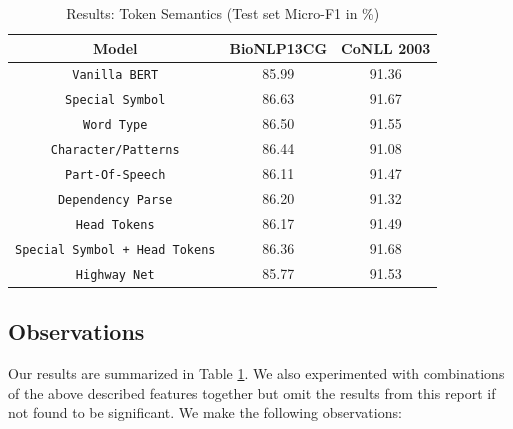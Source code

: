 \begin{table}[h!]
\centering
\begin{tabular}{|c|c|c|}\hline
	\textbf{Model} & \textbf{BioNLP13CG} & \textbf{CoNLL 2003}\\\hline
	\texttt{Vanilla BERT} & 85.99 & 91.36\\\hline
	\texttt{Special Symbol} & 86.63 & 91.67\\\hline
	\texttt{Word Type} & 86.50 & 91.55\\\hline
	\texttt{Character/Patterns} & 86.44 & 91.08\\\hline
	\texttt{Part-Of-Speech} & 86.11 & 91.47\\\hline
	\texttt{Dependency Parse} & 86.20 & 91.32\\\hline
	\texttt{Head Tokens} & 86.17 & 91.49\\\hline
	\texttt{Special Symbol + Head Tokens} & 86.36 & 91.68\\\hline
	\texttt{Highway Net} & 85.77 & 91.53\\\hline
	\end{tabular}
    \caption{Results: Token Semantics (Test set Micro-F1 in \%)}
    \label{tab:res_token_semantics}
\end{table}

\subsection{Observations}
Our results are summarized in Table \ref{tab:res_token_semantics}. We also experimented with combinations of the above described features together but omit the results from this report if not found to be significant. We make the following observations:

